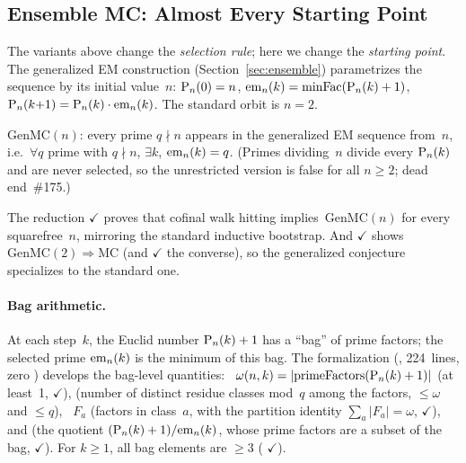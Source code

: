 \subsection{Ensemble MC: Almost Every Starting Point}
\label{sec:ensemble-variant}

The variants above change the \emph{selection rule}; here we change the
\emph{starting point}.  The generalized EM construction
(Section~\ref{sec:ensemble}) parametrizes the sequence by its initial
value~$n$: $\mathrm{P}_{n}(0) = n$,
$\mathrm{em}_{n}(k) = \mathrm{minFac}(\mathrm{P}_{n}(k)+1)$,
$\mathrm{P}_{n}(k{+}1) = \mathrm{P}_{n}(k)\cdot\mathrm{em}_{n}(k)$.
The standard orbit is $n = 2$.

\begin{definition}
$\mathrm{GenMC}(n)$: every prime $q \nmid n$ appears in the generalized EM
sequence from~$n$, i.e.\ $\forall q$ prime with $q \nmid n$, $\exists k$,
$\mathrm{em}_{n}(k) = q$.  (Primes dividing~$n$ divide every $\mathrm{P}_{n}(k)$ and are
never selected, so the unrestricted version is false for all $n \ge 2$;
dead end~\#175.)
\end{definition}

The reduction
{\color{leanink}$\checkmark$} proves that cofinal walk hitting
implies~$\mathrm{GenMC}(n)$ for every squarefree~$n$, mirroring the
standard inductive bootstrap.  And
{\color{leanink}$\checkmark$} shows $\mathrm{GenMC}(2) \Rightarrow
\mathrm{MC}$ (and 
{\color{leanink}$\checkmark$} the converse), so the generalized
conjecture specializes to the standard one.

\paragraph{Bag arithmetic.}
At each step~$k$, the Euclid number $\mathrm{P}_{n}(k)+1$ has a ``bag'' of
prime factors; the selected prime $\mathrm{em}_{n}(k)$ is the minimum of this
bag.  The formalization
(, 224~lines, zero )
develops the bag-level quantities:
~$\omega(n,k) = |\text{primeFactors}(\mathrm{P}_{n}(k)+1)|$
(at least~1,
{\color{leanink}$\checkmark$}),
 (number of distinct residue classes mod~$q$
among the factors, $\leq \omega$ and $\leq q$),
~$F_a$ (factors in class~$a$, with the
partition identity
$\sum_a |F_a| = \omega$,
{\color{leanink}$\checkmark$}),
and  (the quotient
$(\mathrm{P}_{n}(k)+1)/\mathrm{em}_{n}(k)$, whose prime factors are a subset of
the bag,
{\color{leanink}$\checkmark$}).
For $k \geq 1$, all bag elements are $\geq 3$
(
{\color{leanink}$\checkmark$}).

